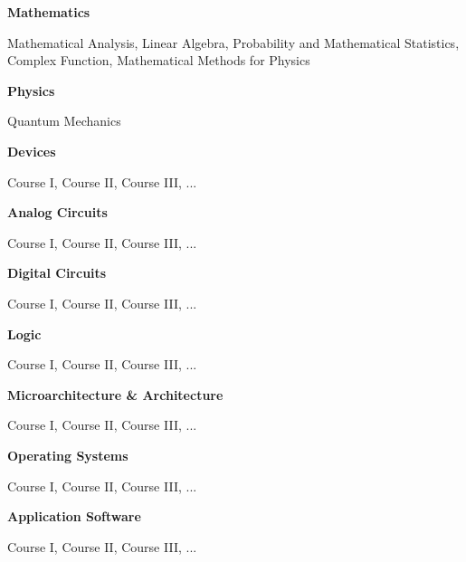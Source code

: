 
\newcommand{\levelentry}[1]{\item \textbf{#1}}
\newenvironment{cvcourses}
{
    \begin{cvlist}\item
    \small
}
{
    \normalsize
    \end{cvlist}
}

\begin{cvlist}
    \levelentry{Mathematics}
    \begin{cvcourses}
        Mathematical Analysis, Linear Algebra, Probability and Mathematical Statistics,
        Complex Function, Mathematical Methods for Physics
    \end{cvcourses}

    \levelentry{Physics}
    \begin{cvcourses}
        Quantum Mechanics
    \end{cvcourses}
    
    \levelentry{Devices}
    \begin{cvcourses}
        Course I, Course II, Course III, ...
    \end{cvcourses}

    \levelentry{Analog Circuits}
    \begin{cvcourses}
        Course I, Course II, Course III, ...
    \end{cvcourses}

    \levelentry{Digital Circuits}
    \begin{cvcourses}
        Course I, Course II, Course III, ...
    \end{cvcourses}

    \levelentry{Logic}
    \begin{cvcourses}
        Course I, Course II, Course III, ...
    \end{cvcourses}

    \levelentry{Microarchitecture \& Architecture}
    \begin{cvcourses}
        Course I, Course II, Course III, ...
    \end{cvcourses}

    \levelentry{Operating Systems}
    \begin{cvcourses}
        Course I, Course II, Course III, ...
    \end{cvcourses}

    \levelentry{Application Software}
    \begin{cvcourses}
        Course I, Course II, Course III, ...
    \end{cvcourses}

\end{cvlist}

\endinput